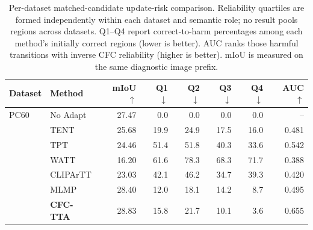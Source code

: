 \begin{table}[t]
\centering
\small
\setlength{\tabcolsep}{4.5pt}
\caption{Per-dataset matched-candidate update-risk comparison. Reliability quartiles are formed independently within each dataset and semantic role; no result pools regions across datasets. Q1--Q4 report correct-to-harm percentages among each method's initially correct regions (lower is better). AUC ranks those harmful transitions with inverse CFC reliability (higher is better). mIoU is measured on the same diagnostic image prefix.}
\label{tab:source-risk-per-dataset}
\begin{tabular}{llrrrrrr}
\toprule
Dataset & Method & mIoU $\uparrow$ & Q1 $\downarrow$ & Q2 $\downarrow$ & Q3 $\downarrow$ & Q4 $\downarrow$ & AUC $\uparrow$ \\
\midrule
PC60 & No Adapt & 27.47 & 0.0 & 0.0 & 0.0 & 0.0 & -- \\
 & TENT & 25.68 & 19.9 & 24.9 & 17.5 & 16.0 & 0.481 \\
 & TPT & 24.46 & 51.4 & 51.8 & 40.3 & 33.6 & 0.542 \\
 & WATT & 16.20 & 61.6 & 78.3 & 68.3 & 71.7 & 0.388 \\
 & CLIPArTT & 23.03 & 42.1 & 46.2 & 34.7 & 39.3 & 0.420 \\
 & MLMP & 28.40 & 12.0 & 18.1 & 14.2 & 8.7 & 0.495 \\
 & \textbf{CFC-TTA} & 28.83 & 15.8 & 21.7 & 10.1 & 3.6 & 0.655 \\
\bottomrule
\end{tabular}
\end{table}
